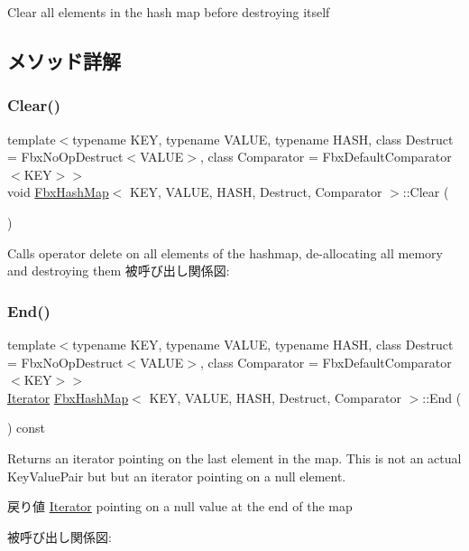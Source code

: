 Clear all elements in the hash map before destroying itself 

\subsection{メソッド詳解}
\mbox{\label{class_fbx_hash_map_a93c7f218e1b8b337296b1758fbe962b9}} 
\subsubsection{\texorpdfstring{Clear()}{Clear()}}
{\footnotesize\ttfamily template$<$typename K\+EY, typename V\+A\+L\+UE, typename H\+A\+SH, class Destruct = Fbx\+No\+Op\+Destruct$<$\+V\+A\+L\+U\+E$>$, class Comparator = Fbx\+Default\+Comparator$<$\+K\+E\+Y$>$$>$ \\
void \hyperlink{class_fbx_hash_map}{Fbx\+Hash\+Map}$<$ K\+EY, V\+A\+L\+UE, H\+A\+SH, Destruct, Comparator $>$\+::Clear (\begin{DoxyParamCaption}{ }\end{DoxyParamCaption})}

Calls operator delete on all elements of the hashmap, de-\/allocating all memory and destroying them 被呼び出し関係図\+:
\mbox{\label{class_fbx_hash_map_a1e7a9c35fff5bc4fb12f5bc49557ebef}} 
\subsubsection{\texorpdfstring{End()}{End()}}
{\footnotesize\ttfamily template$<$typename K\+EY, typename V\+A\+L\+UE, typename H\+A\+SH, class Destruct = Fbx\+No\+Op\+Destruct$<$\+V\+A\+L\+U\+E$>$, class Comparator = Fbx\+Default\+Comparator$<$\+K\+E\+Y$>$$>$ \\
\hyperlink{class_fbx_hash_map_1_1_iterator}{Iterator} \hyperlink{class_fbx_hash_map}{Fbx\+Hash\+Map}$<$ K\+EY, V\+A\+L\+UE, H\+A\+SH, Destruct, Comparator $>$\+::End (\begin{DoxyParamCaption}{ }\end{DoxyParamCaption}) const}

Returns an iterator pointing on the last element in the map. This is not an actual Key\+Value\+Pair but but an iterator pointing on a null element. \begin{DoxyReturn}{戻り値}
\hyperlink{class_fbx_hash_map_1_1_iterator}{Iterator} pointing on a null value at the end of the map 
\end{DoxyReturn}
被呼び出し関係図\+:
\mbox{\label{class_fbx_hash_map_afdedadf0f0aaa2f3a14404515597c399}} 
